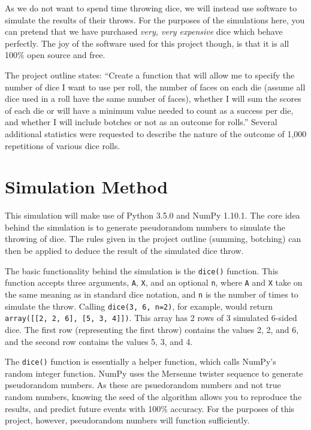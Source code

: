 \documentclass[twocolumn,letterpaper]{article}  %
\begin{document}
As we do not want to spend time throwing dice, we will instead use software to simulate the results of their throws. For the purposes of the simulations here, you can pretend that we have purchased \textit{very, very expensive} dice which behave perfectly. The joy of the software used for this project though, is that it is all 100\% open source and free.

The project outline states: ``Create a function that will allow me to specify the number of dice I want to use per roll, the number of faces on each die (assume all dice used in a roll have the same number of faces), whether I will sum the scores of each die or will have a minimum value needed to count as a success per die, and whether I will include botches or not as an outcome for rolls.'' Several additional statistics were requested to describe the nature of the outcome of 1,000 repetitions of various dice rolls.

\section{Simulation Method}

This simulation will make use of Python 3.5.0 and NumPy 1.10.1. The core idea behind the simulation is to generate pseudorandom numbers to simulate the throwing of dice. The rules given in the project outline (summing, botching) can then be applied to deduce the result of the simulated dice throw.

The basic functionality behind the simulation is the \texttt{dice()} function. This function accepts three arguments, \texttt{A}, \texttt{X}, and an optional \texttt{n}, where \texttt{A} and \texttt{X} take on the same meaning as in standard dice notation, and \texttt{n} is the number of times to simulate the throw. Calling \texttt{dice(3, 6, n=2)}, for example, would return \texttt{array([[2, 2, 6], [5, 3, 4]])}. This array has 2 rows of 3 simulated 6-sided dice. The first row (representing the first throw) contains the values 2, 2, and 6, and the second row contains the values 5, 3, and 4.

The \texttt{dice()} function is essentially a helper function, which calls NumPy's random integer function. NumPy uses the Mersenne twister sequence to generate pseudorandom numbers. As these are psuedorandom numbers and not true random numbers, knowing the seed of the algorithm allows you to reproduce the results, and predict future events with 100\% accuracy. For the purposes of this project, however, pseudorandom numbers will function sufficiently.
\end{document}

